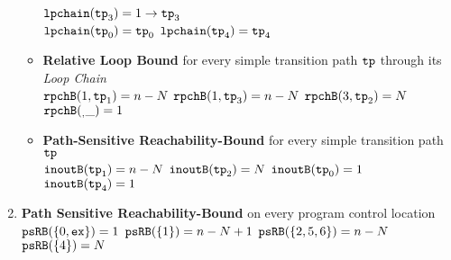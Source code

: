 \begin{enumerate}
\begin{itemize}
  $\mathtt{lpchain}(\mathtt{tp}_3) = 1 \to \mathtt{tp}_3$ \\
  $\mathtt{lpchain}(\mathtt{tp}_0) = \mathtt{tp}_0$ \quad
  $\mathtt{lpchain}(\mathtt{tp}_4) = \mathtt{tp}_4$
  \item \textbf{{Relative Loop Bound}} for every simple transition path $\mathtt{tp}$ through its \emph{Loop Chain}
  \\
  $\mathtt{rpchB}(1, \mathtt{tp}_1) = n - N$ \quad
  $\mathtt{rpchB}(1, \mathtt{tp}_3) = n - N$ \quad
   \quad
  $\mathtt{rpchB}(3, \mathtt{tp}_2) = N$ \quad
  $\mathtt{rpchB}(_, \_) = 1 $ 
  \item \textbf{Path-Sensitive Reachability-Bound} for every simple transition path $\mathtt{tp}$
  \\
  $\mathtt{inoutB}(\mathtt{tp}_1) = n - N$ \quad
  $\mathtt{inoutB}(\mathtt{tp}_2) = N$ \quad
  $\mathtt{inoutB}(\mathtt{tp}_0) = 1$ 
  \\
   \quad
  $\mathtt{inoutB}(\mathtt{tp}_4) = 1$ 
  \end{itemize}
\item \textbf{Path Sensitive Reachability-Bound} on every program control location
\\
$\mathtt{psRB}(\{0, \mathtt{ex}\}) = 1$ \quad
$\mathtt{psRB}(\{1\}) = n - N + 1$ \quad
$\mathtt{psRB}(\{2, 5, 6\}) = n - N$ \\
 \quad
$\mathtt{psRB}(\{4\}) = N$
\end{enumerate}